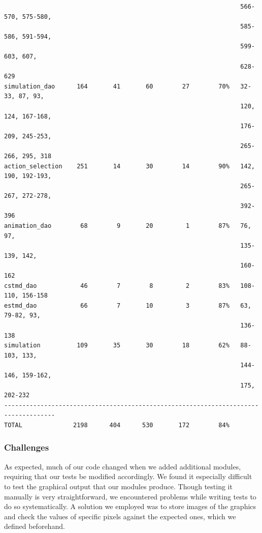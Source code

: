 \documentclass[a4paper,11pt]{article}
\begin{document}
\begin{verbatim}
                                                                 566-570, 575-580, 
                                                                 585-586, 591-594, 
                                                                 599-603, 607, 
                                                                 628-629
simulation_dao      164       41       60        27        70%   32-33, 87, 93, 
                                                                 120, 124, 167-168, 
                                                                 176-209, 245-253, 
                                                                 265-266, 295, 318
action_selection    251       14       30        14        90%   142, 190, 192-193, 
                                                                 265-267, 272-278, 
                                                                 392-396
animation_dao        68        9       20         1        87%   76, 97, 
                                                                 135-139, 142, 
                                                                 160-162
cstmd_dao            46        7        8         2        83%   108-110, 156-158                                                                                                                 
estmd_dao            66        7       10         3        87%   63, 79-82, 93, 
                                                                 136-138
simulation          109       35       30        18        62%   88-103, 133, 
                                                                 144-146, 159-162, 
                                                                 175, 202-232
------------------------------------------------------------------------------------
TOTAL              2198      404      530       172        84%  
\end{verbatim}

\subsubsection{Challenges}
As expected, much of our code changed when we added additional modules, requiring that our tests be modified accordingly.  We found it especially difficult to test the graphical output that our modules produce. Though testing it manually is very straightforward, we encountered problems while writing tests to do so systematically. A solution we employed was to store images of the graphics and check the values of specific pixels against the expected ones, which we defined beforehand.
\end{document}
